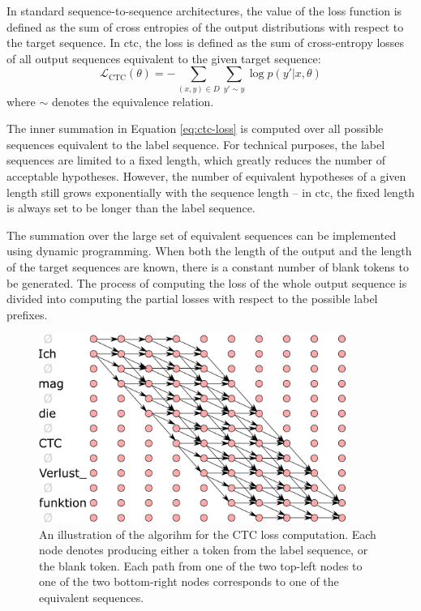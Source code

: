 In standard sequence-to-sequence architectures, the value of the loss function
is defined as the sum of cross entropies of the output distributions with
respect to the target sequence.%
In \ac{ctc}, the
loss is defined as the sum of cross-entropy losses of all output sequences
equivalent to the given target sequence:
%
\begin{equation}
  \mathcal{L}_{\text{CTC}}({\theta}) = - \sum_{(x, y) \in D} \sum_{y' \sim y}  \log p(y' | x, \theta)
  \label{eq:ctc-loss}
\end{equation}
%
where $\sim$ denotes the equivalence relation.

The inner summation in Equation \ref{eq:ctc-loss} is computed over all possible
sequences equivalent to the label sequence. For technical purposes, the label
sequences are limited to a fixed length, which greatly reduces the number of
acceptable hypotheses. However, the number of equivalent hypotheses of a given
length still grows exponentially with the sequence length -- in \ac{ctc}, the
fixed length is always set to be longer than the label sequence.


The summation over the large set of equivalent sequences can be implemented
using dynamic programming. When both the length of the output and the length of
the target sequences are known, there is a constant number of blank tokens to
be generated. The process of computing the loss of the whole output sequence is
divided into computing the partial losses with respect to the possible label
prefixes.

\begin{figure}
  \centering

  \includegraphics[width=10cm]{img/ctc_schema.png}

  \caption{An illustration of the algorihm for the CTC loss computation. Each
    node denotes producing either a token from the label sequence, or the blank
    token. Each path from one of the two top-left nodes to one of the two
    bottom-right nodes corresponds to one of the equivalent sequences.  }
  \label{fig:ctc-dynamic-programming}
\end{figure}

